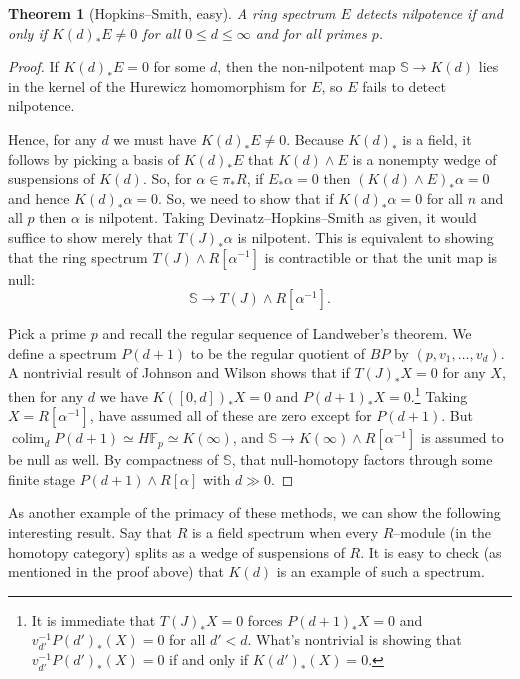 \documentclass{amsart}
\renewcommand{\S}{\mathbb S}
\newcommand{\F}{\mathbb F}
\newcommand{\<}{\langle}
\renewcommand{\>}{\rangle}
\newcommand{\sm}{\wedge}
\DeclareMathOperator{\colim}{colim}
\theoremstyle{plain}
\newtheorem*{theorem}{Theorem}
\theoremstyle{definition}
\theoremstyle{remark}
\begin{document}
\begin{theorem}[Hopkins--Smith, easy]
A ring spectrum $E$ detects nilpotence if and only if $K(d)_* E \ne 0$ for all $0 \le d \le \infty$ and for all primes $p$.
\end{theorem}
\begin{proof}
If $K(d)_* E = 0$ for some $d$, then the non-nilpotent map $\S \to K(d)$ lies in the kernel of the Hurewicz homomorphism for $E$, so $E$ fails to detect nilpotence.

Hence, for any $d$ we must have $K(d)_* E \ne 0$.  Because $K(d)_*$ is a field, it follows by picking a basis of $K(d)_* E$ that $K(d) \sm E$ is a nonempty wedge of suspensions of $K(d)$.  So, for $\alpha \in \pi_* R$, if $E_* \alpha = 0$ then $(K(d) \sm E)_* \alpha = 0$ and hence $K(d)_* \alpha = 0$.  So, we need to show that if $K(d)_* \alpha = 0$ for all $n$ and all $p$ then $\alpha$ is nilpotent.  Taking Devinatz--Hopkins--Smith as given, it would suffice to show merely that $T(J)_* \alpha$ is nilpotent.  This is equivalent to showing that the ring spectrum $T(J) \sm R[\alpha^{-1}]$ is contractible or that the unit map is null: \[\S \to T(J) \sm R[\alpha^{-1}].\]

Pick a prime $p$ and recall the regular sequence of Landweber's theorem.  We define a spectrum $P(d+1)$ to be the regular quotient of $BP$ by $(p, v_1, \ldots, v_d)$.  A nontrivial result of Johnson and Wilson shows that if $T(J)_* X = 0$ for any $X$, then for any $d$ we have $K([0, d])_* X = 0$ and $P(d+1)_* X = 0$.\footnote{It is immediate that $T(J)_* X = 0$ forces $P(d+1)_* X = 0$ and $v_{d'}^{-1} P(d')_*(X) = 0$ for all $d' < d$.  What's nontrivial is showing that $v_{d'}^{-1} P(d')_*(X) = 0$ if and only if $K(d')_*(X) = 0$.}  Taking $X = R[\alpha^{-1}]$, have assumed all of these are zero except for $P(d+1)$.  But $\colim_d P(d+1) \simeq H\F_p \simeq K(\infty)$, and $\S \to K(\infty) \sm R[\alpha^{-1}]$ is assumed to be null as well.  By compactness of $\S$, that null-homotopy factors through some finite stage $P(d+1) \sm R[\alpha]$ with $d \gg 0$.
\end{proof}

As another example of the primacy of these methods, we can show the following interesting result.  Say that $R$ is a field spectrum when every $R$--module (in the homotopy category) splits as a wedge of suspensions of $R$.  It is easy to check (as mentioned in the proof above) that $K(d)$ is an example of such a spectrum.
\end{document}

